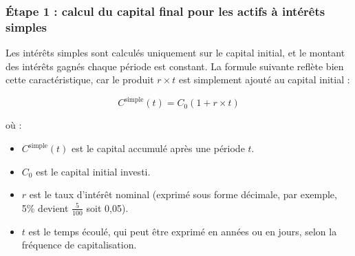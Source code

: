 \documentclass{article}
\begin{document}
\subsubsection*{Étape 1 : calcul du capital final pour les actifs à intérêts simples}

\begin{tcolorbox}[
		colback=lightgreen, 
		colframe=lightgreen, 
		boxrule=0.5pt, 
		arc=0pt, 
		left=10pt, 
		right=10pt, 
		top=6pt, 
		bottom=6pt, 
		boxsep=2pt, 
		before upper={\faLightbulb\hspace{10pt}}
	]
	Les intérêts simples sont calculés uniquement sur le capital initial, et le montant des intérêts gagnés chaque période est constant. La formule suivante reflète bien cette caractéristique, car le produit \( r \times t \) est simplement ajouté au capital initial :
	
	\[
		C^{\text{simple}}(t) = C_0 \left(1 + r \times t\right)
	\]
	    
	où :
	\begin{itemize}
		\item \( C^{\text{simple}}(t) \) est le capital accumulé après une période \( t \).
		\item \( C_0 \) est le capital initial investi.
		\item \( r \) est le taux d'intérêt nominal (exprimé sous forme décimale, par exemple, 5\% devient $\frac{5}{100}$ soit 0,05).
		\item \( t \) est le temps écoulé, qui peut être exprimé en années ou en jours, selon la fréquence de capitalisation.
	\end{itemize}
\end{tcolorbox}
\end{document}
